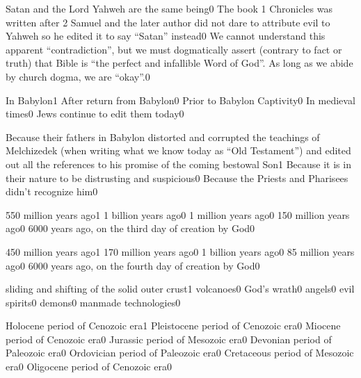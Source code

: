 {Satan and the Lord Yahweh are the same being}{0}
{The book 1 Chronicles was written after 2 Samuel and the later author did not dare to attribute evil to Yahweh so he edited it to say ``Satan'' instead}{0}
{We cannot understand this apparent ``contradiction'', but we must dogmatically assert (contrary to fact or truth) that Bible is ``the perfect and infallible Word of God''. As long as we abide by church dogma, we are ``okay''.}{0}
\qstop

{In Babylon}{1}
{After return from Babylon}{0}
{Prior to Babylon Captivity}{0}
{In medieval times}{0}
{Jews continue to edit them today}{0}
\qstop

{Because their fathers in Babylon distorted and corrupted the teachings of Melchizedek (when writing what we know today as ``Old Testament'') and edited out all the references to his promise of the coming bestowal Son}{1}
{Because it is in their nature to be distrusting and suspicious}{0}
{Because the Priests and Pharisees didn't recognize him}{0}
\qstop

{550 million years ago}{1}
{1 billion years ago}{0}
{1 million years ago}{0}
{150 million years ago}{0}
{6000 years ago, on the third day of creation by God}{0}
\qstop

{450 million years ago}{1}
{170 million years ago}{0}
{1 billion years ago}{0}
{85 million years ago}{0}
{6000 years ago, on the fourth day of creation by God}{0}
\qstop

{sliding and shifting of the solid outer crust}{1}
{volcanoes}{0}
{God's wrath}{0}
{angels}{0}
{evil spirits}{0}
{demons}{0}
{manmade technologies}{0}
\qstop

{Holocene period of Cenozoic era}{1}
{Pleistocene period of Cenozoic era}{0}
{Miocene period of Cenozoic era}{0}
{Jurassic period of Mesozoic era}{0}
{Devonian period of Paleozoic era}{0}
{Ordovician period of Paleozoic era}{0}
{Cretaceous period of Mesozoic era}{0}
{Oligocene period of Cenozoic era}{0}
\qstop

